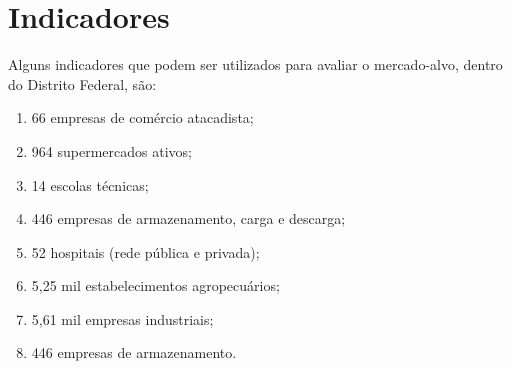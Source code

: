 \section{Indicadores}

Alguns indicadores que podem ser utilizados para avaliar o mercado-alvo, dentro
do Distrito Federal, são:

\begin{enumerate}
  \item 66 empresas de comércio atacadista;
  \item 964 supermercados ativos;
  \item 14 escolas técnicas;
  \item 446 empresas de armazenamento, carga e descarga;
  \item 52 hospitais (rede pública e privada);
  \item 5,25 mil estabelecimentos agropecuários;
  \item 5,61 mil empresas industriais;
  \item 446 empresas de armazenamento.
\end{enumerate}
